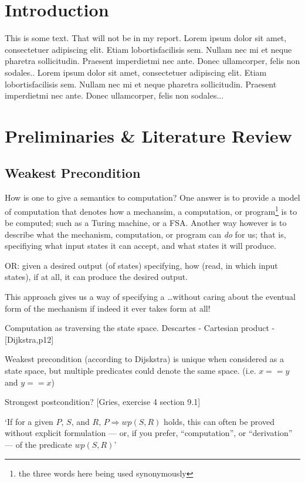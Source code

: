 \documentclass[oneside,12pt]{article}
\begin{document}
\section{Introduction}

This is some text. That will not be in my report. Lorem  ipsum  dolor  sit  amet,  consectetuer  adipiscing  
elit.   Etiam  lobortisfacilisis sem.  Nullam nec mi et 
neque pharetra sollicitudin.  Praesent imperdietmi nec ante. 
Donec ullamcorper, felis non sodales.. Lorem  ipsum  dolor  sit  amet,  consectetuer  adipiscing  
elit.   Etiam  lobortisfacilisis sem.  Nullam nec mi et 
neque pharetra sollicitudin.  Praesent imperdietmi nec ante. 
Donec ullamcorper, felis non sodales...

\section{Preliminaries \& Literature Review}

\subsection{Weakest Precondition}

How is one to give a semantics to computation? One answer is to provide a model of computation that denotes how a mechansim, a computation, or program\footnote{ the three words here being used synonymously} is to be computed; such as a Turing machine, or a FSA. Another way however is to describe what the mechanism, computation, or program can \emph{do} for us; that is, specifiying what input states it can accept, and what states it will produce.

OR: given a desired output (of states) specifying, how (read, in which input states), if at all, it can produce the desired output.

This approach gives us a way of specifying a \ldots without caring about the eventual form of the mechanism if indeed it ever takes form at all!



Computation as traversing the state space. Descartes - Cartesian product - [Dijkstra,p12]

Weakest precondition (according to Dijskstra) is unique when considered as a state space, but multiple predicates could denote the same space. (i.e. $x == y$ and $y == x$)

Strongest postcondition?
[Gries, exercise 4 section 9.1]


`If for a given $P$, $S$, and $R$, $P \Rightarrow wp(S,R)$ holds, this can often be proved without explicit formulation --- or, if you prefer, ``computation'', or ``derivation'' --- of the predicate $wp(S,R)$'
\end{document}
